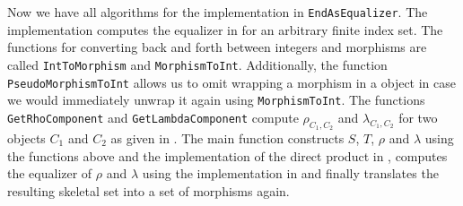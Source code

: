 \begin{rem}[Implementation]
Now we have all algorithms for the implementation in \texttt{EndAsEqualizer}. The implementation computes the equalizer in  for an arbitrary finite index set. The functions for converting back and forth between integers and morphisms are called \texttt{IntToMorphism} and \texttt{MorphismToInt}. Additionally, the function \texttt{PseudoMorphismToInt} allows us to omit wrapping a morphism in a \GAP{} object in case we would immediately unwrap it again using \texttt{MorphismToInt}. The functions \texttt{GetRhoComponent} and \texttt{GetLambdaComponent} compute $\rho_{C_1,C_2}$ and $\lambda_{C_1,C_2}$ for two objects $C_1$ and $C_2$ as given in . The main function constructs $S$, $T$, $\rho$ and $\lambda$ using the functions above and the implementation of the direct product in \SkeletalFinSets{}, computes the equalizer of $\rho$ and $\lambda$ using the implementation in \SkeletalFinSets{} and finally translates the resulting skeletal set into a set of morphisms again.
\end{rem}

